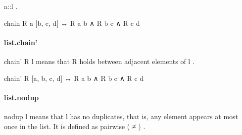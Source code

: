 \documentclass{article}
\begin{document}
\colorbox[RGB]{253,246,227}{{{{\color[RGB]{101, 123, 131} a::l }}}}.
\\
\colorbox[RGB]{253,246,227}{\parbox{4.5in}{{{{\color[RGB]{101, 123, 131} chain R a {[}b, c, d{]}  }}}{{{\color[RGB]{181, 137, 0} ↔ }}}{{{\color[RGB]{101, 123, 131}  R a b  }}}{{{\color[RGB]{181, 137, 0} ∧ }}}{{{\color[RGB]{101, 123, 131}  R b c  }}}{{{\color[RGB]{181, 137, 0} ∧ }}}{{{\color[RGB]{101, 123, 131}  R c d }}}\\

}}\paragraph{list.chain'}
\par
\colorbox[RGB]{253,246,227}{{{{\color[RGB]{101, 123, 131} chain' R l }}}} means that 
\colorbox[RGB]{253,246,227}{{{{\color[RGB]{101, 123, 131} R }}}} holds between adjacent elements of 
\colorbox[RGB]{253,246,227}{{{{\color[RGB]{101, 123, 131} l }}}}.
\\
\colorbox[RGB]{253,246,227}{\parbox{4.5in}{{{{\color[RGB]{101, 123, 131} chain' R {[}a, b, c, d{]}  }}}{{{\color[RGB]{181, 137, 0} ↔ }}}{{{\color[RGB]{101, 123, 131}  R a b  }}}{{{\color[RGB]{181, 137, 0} ∧ }}}{{{\color[RGB]{101, 123, 131}  R b c  }}}{{{\color[RGB]{181, 137, 0} ∧ }}}{{{\color[RGB]{101, 123, 131}  R c d }}}\\

}}\paragraph{list.nodup}
\par
\colorbox[RGB]{253,246,227}{{{{\color[RGB]{101, 123, 131} nodup l }}}} means that 
\colorbox[RGB]{253,246,227}{{{{\color[RGB]{101, 123, 131} l }}}} has no duplicates, that is, any element appears at most
once in the list. It is defined as 
\colorbox[RGB]{253,246,227}{{{{\color[RGB]{101, 123, 131} pairwise ( }}}{{{\color[RGB]{181, 137, 0} ≠ }}}{{{\color[RGB]{101, 123, 131} ) }}}}.
\end{document}
